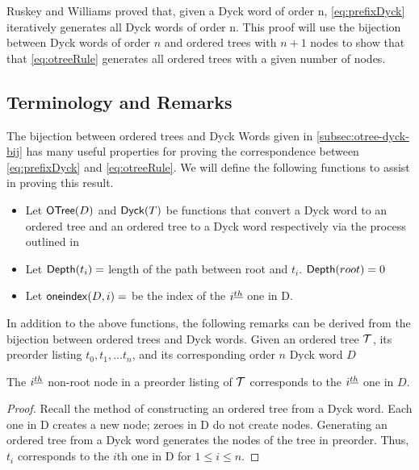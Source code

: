 
Ruskey and Williams proved that, given a Dyck word of order n, \ref{eq:prefixDyck} iteratively generates all Dyck words of order n.  This proof will use the bijection between Dyck words of order $n$ and ordered trees with $n+1$ nodes to show that that \ref{eq:otreeRule} generates all ordered trees with a given number of nodes.  


\subsection{Terminology and Remarks}

The bijection between ordered trees and Dyck Words given in \ref{subsec:otree-dyck-bij} has many useful properties for proving the correspondence between \ref{eq:prefixDyck} and \ref{eq:otreeRule}.  We will define the following functions to assist in proving this result.


\begin{itemize}
    \item Let $\mathsf{OTree}{(D)}$ and $\mathsf{Dyck}{(T)}$ be functions that convert a Dyck word to an ordered tree and an ordered tree to a Dyck word respectively via the process outlined in 
    \item Let $\mathsf{Depth}{(t_i)}=$ length of the path between root and $t_i$. $\mathsf{Depth}{(root)}=0$
    \item Let $\mathsf{oneindex}({D}, i)=$ be the index of the $i^{\underline{th}}{}$ one in D.
\end{itemize}



In addition to the above functions, 
the following remarks can be derived from the bijection between ordered trees and Dyck words. 
Given an ordered tree $\mathcal{T}$, its preorder listing $t_0,t_1,...t_n$, and its corresponding order $n$ Dyck word $D$
\begin{remark}
    The $i^{\underline{th}}$ non-root node in a preorder listing of $\mathcal{T}$ corresponds to the $i^{\underline{th}}$ one in $D$.

\end{remark}
\begin{proof}
    Recall the method of constructing an ordered tree from a Dyck word.  Each one in D creates a new node; zeroes in D do not create nodes.  Generating an ordered tree from a Dyck word generates the nodes of the tree in preorder.  Thus, $t_i$ corresponds to the $i$th one in D for $1 \le i \le n$.
\end{proof}


